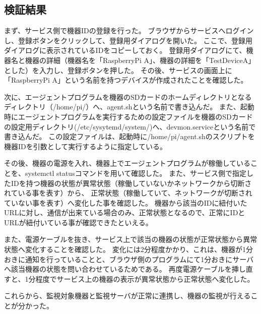 \subsection{検証結果}
まず、サービス側で機器IDの登録を行った。
ブラウザからサービスへログインし、登録ボタンをクリックして、登録用ダイアログを開いた。
ここで、登録用ダイアログに表示されているIDをコピーしておく。
登録用ダイアログにて、機器名と機器の詳細（機器名を「RaspberryPi A」、機器の詳細を「TestDeviceA」とした）を入力し、登録ボタンを押した。
その後、サービスの画面上に「RaspberryPi A」という名前を持つデバイスが作成されたことを確認した。

次に、エージェントプログラムを機器のSDカードのホームディレクトリとなるディレクトリ（/home/pi/）へ、agent.shという名前で書き込んだ。
また、起動時にエージェントプログラムを実行するための設定ファイルを機器のSDカードの設定用ディレクトリ(/etc/sysytemd/system/)へ、devmon.serviceという名前で書き込んだ。
この設定ファイルは、起動時に/home/pi/agent.shのスクリプトを機器IDを引数として実行するように指定している。

その後、機器の電源を入れ、機器上でエージェントプログラムが稼働していることを、systemctl statusコマンドを用いて確認した。
また、サービス側で指定したIDを持つ機器の状態が異常状態（稼働していないかネットワークから切断されている事を表す）から、
正常状態（稼働していて、ネットワークが切断されていない事を表す）へ変化した事を確認した。
機器から該当のIDに紐付いたURLに対し、通信が出来ている場合のみ、正常状態となるので、正常にIDとURLが紐付いている事が確認できたといえる。

また、電源ケーブルを抜き、サービス上で該当の機器の状態が正常状態から異常状態へ変化することを確認した。
変化には2分程度かかり、これは、機器が1分おきに通知を行っていることと、ブラウザ側のプログラムにて1分おきにサーバへ該当機器の状態を問い合わせているためである。
再度電源ケーブルを挿し直すと、1分程度でサービス上の機器の表示が異常状態から正常状態へ変化した。

これらから、監視対象機器と監視サーバが正常に連携し、機器の監視が行えることが分かった。

